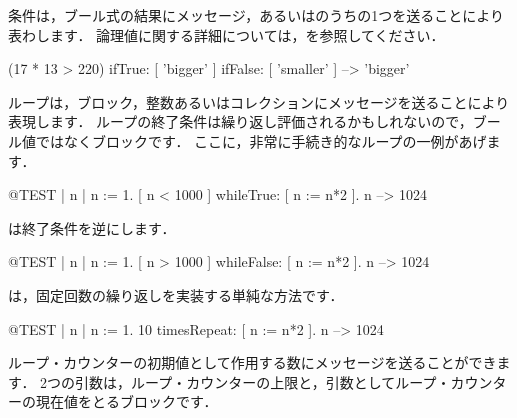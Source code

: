 \documentclass[a4paper,10pt,twoside]{book}
\begin{document}
条件は，ブール式の結果にメッセージ，あるいはのうちの1つを送ることにより表わします．
論理値に関する詳細については，を参照してください．

\begin{code}{}
(17 * 13 > 220)
   ifTrue: [ 'bigger' ]
   ifFalse: [ 'smaller' ] --> 'bigger'
\end{code}

ループは，ブロック，整数あるいはコレクションにメッセージを送ることにより表現します．
ループの終了条件は繰り返し評価されるかもしれないので，ブール値ではなくブロックです．
ここに，非常に手続き的なループの一例があげます．


\begin{code}{@TEST | n |}
n := 1.
[ n < 1000 ] whileTrue: [ n := n*2 ].
n --> 1024
\end{code}

\noindent
は終了条件を逆にします．
\begin{code}{@TEST | n |}
n := 1.
[ n > 1000 ] whileFalse: [ n := n*2 ].
n --> 1024
\end{code}

\noindent
は，固定回数の繰り返しを実装する単純な方法です．

\begin{code}{@TEST | n |}
n := 1.
10 timesRepeat: [ n := n*2 ].
n --> 1024
\end{code}

ループ・カウンターの初期値として作用する数にメッセージを送ることができます．
2つの引数は，ループ・カウンターの上限と，引数としてループ・カウンターの現在値をとるブロックです．
\end{document}
